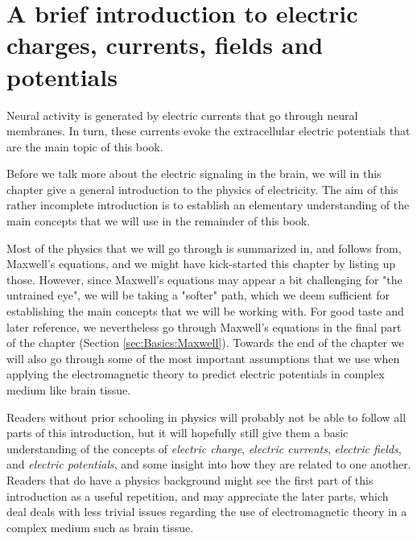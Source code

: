 \chapter{A brief introduction to electric charges, currents, fields and potentials} 
\label{chap:Basics}

Neural activity is generated by electric currents that go through neural membranes. In turn, these currents
evoke the extracellular electric potentials that are the main topic of this book. 

Before we talk more about the electric signaling in the brain, we will in this chapter give a general introduction to the physics of electricity. The aim of this rather incomplete introduction is to establish an elementary understanding of the main concepts that we will use in the remainder of this book. 

Most of the physics that we will go through is summarized in, and follows from, Maxwell's equations, and we might have kick-started this chapter by listing up those. However, since Maxwell's equations may appear a bit challenging for "the untrained eye", we will be taking a "softer" path, which we deem sufficient for establishing the main concepts that we will be working with. For good taste and later reference, we nevertheless go through Maxwell's equations in the final part of the chapter (Section \ref{sec:Basics:Maxwell}). Towards the end of the chapter we will also go through some of the most important assumptions that we use when applying the electromagnetic theory to predict electric potentials in complex medium like brain tissue.

Readers without prior schooling in physics will probably not be able to follow all parts of this introduction, but it will hopefully still give them a basic understanding of the concepts of \textit{electric charge}, \textit{electric currents}, \textit{electric fields}, and \textit{electric potentials}, and some insight into how they are related to one another. Readers that do have a physics background might see the first part of this introduction as a useful repetition, and may appreciate the later parts, which deal deals with less trivial issues regarding the use of electromagnetic theory in a complex medium such as brain tissue. 




